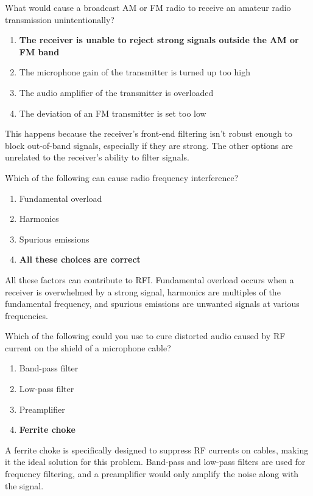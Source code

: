 \begin{tcolorbox}[colback=gray!10!white,colframe=black!75!black,title={T7B02}]
    What would cause a broadcast AM or FM radio to receive an amateur radio transmission unintentionally?
    \begin{enumerate}[label=\Alph*),noitemsep]
        \item \textbf{The receiver is unable to reject strong signals outside the AM or FM band}
        \item The microphone gain of the transmitter is turned up too high
        \item The audio amplifier of the transmitter is overloaded
        \item The deviation of an FM transmitter is set too low
    \end{enumerate}
\end{tcolorbox}

This happens because the receiver's front-end filtering isn't robust enough to block out-of-band signals, especially if they are strong. The other options are unrelated to the receiver's ability to filter signals.

\begin{tcolorbox}[colback=gray!10!white,colframe=black!75!black,title={T7B03}]
    Which of the following can cause radio frequency interference?
    \begin{enumerate}[label=\Alph*),noitemsep]
        \item Fundamental overload
        \item Harmonics
        \item Spurious emissions
        \item \textbf{All these choices are correct}
    \end{enumerate}
\end{tcolorbox}

All these factors can contribute to RFI. Fundamental overload occurs when a receiver is overwhelmed by a strong signal, harmonics are multiples of the fundamental frequency, and spurious emissions are unwanted signals at various frequencies.

\begin{tcolorbox}[colback=gray!10!white,colframe=black!75!black,title={T7B04}]
    Which of the following could you use to cure distorted audio caused by RF current on the shield of a microphone cable?
    \begin{enumerate}[label=\Alph*),noitemsep]
        \item Band-pass filter
        \item Low-pass filter
        \item Preamplifier
        \item \textbf{Ferrite choke}
    \end{enumerate}
\end{tcolorbox}

A ferrite choke is specifically designed to suppress RF currents on cables, making it the ideal solution for this problem. Band-pass and low-pass filters are used for frequency filtering, and a preamplifier would only amplify the noise along with the signal.
